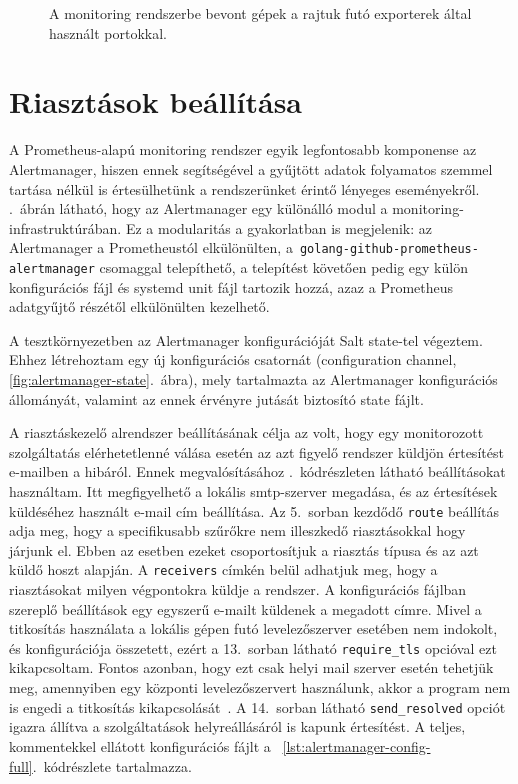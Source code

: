 \begin{figure}[ht]
	\centering
	
	\caption{A monitoring rendszerbe bevont gépek a rajtuk futó exporterek által használt portokkal.}
	\label{fig:monitoring-setup}
\end{figure}

\section{Riasztások beállítása}
A Prometheus-alapú monitoring rendszer egyik legfontosabb komponense az Alertmanager, hiszen ennek segítségével a gyűjtött adatok folyamatos szemmel tartása nélkül is értesülhetünk a rendszerünket érintő lényeges eseményekről.
.~ábrán látható, hogy az Alertmanager egy különálló modul a monitoring-infrastruktúrában. Ez a modularitás a gyakorlatban is megjelenik: az Alertmanager a Prometheustól elkülönülten, a~\texttt{golang-github-prometheus-alertmanager} csomaggal telepíthető, a telepítést követően pedig egy külön konfigurációs fájl és systemd unit fájl tartozik hozzá, azaz a Prometheus adatgyűjtő részétől elkülönülten kezelhető.

A tesztkörnyezetben az Alertmanager konfigurációját Salt state-tel végeztem. Ehhez létrehoztam egy új konfigurációs csatornát (configuration channel, \ref{fig:alertmanager-state}.~ábra), mely tartalmazta az Alertmanager konfigurációs állományát, valamint az ennek érvényre jutását biztosító state fájlt.

A riasztáskezelő alrendszer beállításának célja az volt, hogy egy monitorozott szolgáltatás elérhetetlenné válása esetén az azt figyelő rendszer küldjön értesítést e-mailben a hibáról. Ennek megvalósításához .~kódrészleten látható beállításokat használtam. Itt megfigyelhető a lokális \acrshort{smtp}-szerver megadása, és az értesítések küldéséhez használt e-mail cím beállítása.
Az 5.~sorban kezdődő \texttt{route} beállítás adja meg, hogy a specifikusabb szűrőkre nem illeszkedő riasztásokkal hogy járjunk el. Ebben az esetben ezeket csoportosítjuk a riasztás típusa és az azt küldő hoszt alapján. A \texttt{receivers} címkén belül adhatjuk meg, hogy a riasztásokat milyen végpontokra küldje a rendszer. A konfigurációs fájlban szereplő beállítások egy egyszerű e-mailt küldenek a megadott címre. Mivel a titkosítás használata a lokális gépen futó levelezőszerver esetében nem indokolt, és konfigurációja összetett, ezért a 13.~sorban látható \texttt{require\_tls} opcióval ezt kikapcsoltam. Fontos azonban, hogy ezt csak helyi mail szerver esetén tehetjük meg, amennyiben egy központi levelezőszervert használunk, akkor a program nem is engedi a titkosítás kikapcsolását~\cite{PrometheusAlertmanagerConfig}.
A 14.~sorban látható \texttt{send\_resolved} opciót igazra állítva a szolgáltatások helyreállásáról is kapunk értesítést. %
A teljes, kommentekkel ellátott konfigurációs fájlt a ~\ref{lst:alertmanager-config-full}.~kódrészlete tartalmazza.

